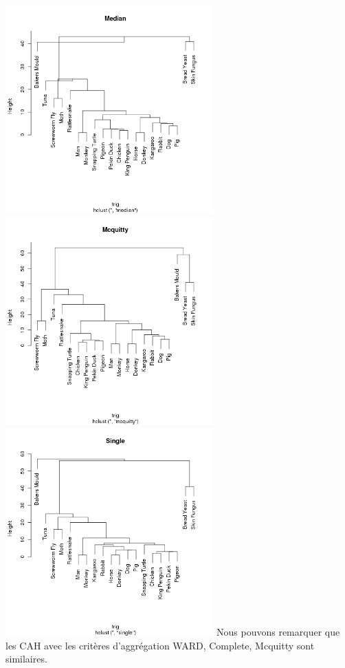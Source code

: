 \documentclass[a4paper, 10pt]{article}
\begin{document}
\includegraphics[height = 8cm, width = 8cm]{plots/plot_median_1.png}\\
\includegraphics[height = 8cm, width = 8cm]{plots/plot_mcquitty_1.png}
\includegraphics[height = 8cm, width = 8cm]{plots/plot_single_1.png}
\newpage
\noindent
Nous pouvons remarquer que les CAH avec les crit\`eres d'aggr\'egation WARD, Complete, Mcquitty sont similaires.\\
\end{document}
